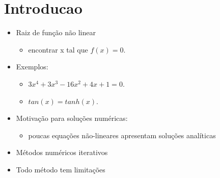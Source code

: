 \section{Introducao}

\begin{itemize}

 \item Raiz de função não linear
 \begin{itemize}
  \item encontrar x tal que $f(x) = 0$.
 \end{itemize}

 \item Exemplos:
 \begin{itemize}
  \item $3x^{4} + 3x^{3} - 16x^{2} + 4x + 1 = 0$.
  \item $tan(x) = tanh(x)$.
 \end{itemize}

\item Motivação para soluções numéricas:
 \begin{itemize}
  \item poucas equações não-lineares apresentam soluções analíticas
 \end{itemize}

\item Métodos numéricos iterativos

\item Todo método tem limitações

\end{itemize}
